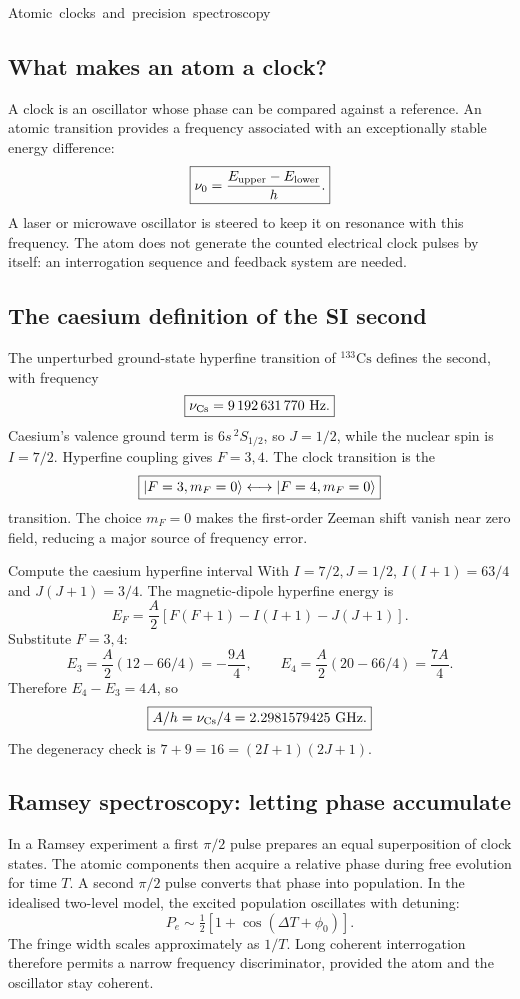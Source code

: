 \unit{Atomic clocks and precision spectroscopy}
\subsection{What makes an atom a clock?}
A clock is an oscillator whose phase
can be compared against a reference.
An atomic transition provides a frequency
associated with an exceptionally stable
energy difference:
\[
\boxed{\nu_0=\frac{E_{\rm upper}-E_{\rm lower}}{h}.}
\]
A laser or microwave oscillator is steered
to keep it on resonance with this
frequency. The atom does not generate
the counted electrical clock pulses
by itself: an interrogation sequence
and feedback system are needed.

\subsection{The caesium definition of the SI second}
The unperturbed ground-state hyperfine
transition of \(^{133}\mathrm{Cs}\) defines
the second, with frequency
\[
\boxed{\nu_{\rm Cs}=9\,192\,631\,770\ \mathrm{Hz}.}
\]
Caesium's valence ground term is
\(6s\,{}^2S_{1/2}\), so \(J=1/2\),
while the nuclear spin is \(I=7/2\).
Hyperfine coupling gives \(F=3,4\).
The clock transition is the
\[
\boxed{\left\lvert F=3,m_F=0\right\rangle
\longleftrightarrow\left\lvert F=4,m_F=0\right\rangle}
\]
transition. The choice \(m_F=0\) makes
the first-order Zeeman shift vanish
near zero field, reducing a major
source of frequency error.

\begin{worked}{Compute the caesium hyperfine interval}
With \(I=7/2,J=1/2\),
\(I(I+1)=63/4\) and \(J(J+1)=3/4\).
The magnetic-dipole hyperfine energy is
\[
E_F=\frac A2
[F(F+1)-I(I+1)-J(J+1)].
\]
Substitute \(F=3,4\):
\[
E_3=\frac A2(12-66/4)
=-\frac{9A}{4},\qquad
E_4=\frac A2(20-66/4)
=\frac{7A}{4}.
\]
Therefore \(E_4-E_3=4A\), so
\[
\boxed{A/h=\nu_{\rm Cs}/4
=2.2981579425\ \mathrm{GHz}.}
\]
The degeneracy check is
\(7+9=16=(2I+1)(2J+1)\).
\end{worked}

\subsection{Ramsey spectroscopy: letting phase accumulate}
In a Ramsey experiment a first
\(\pi/2\) pulse prepares an equal
superposition of clock states.
The atomic components then acquire
a relative phase during free evolution
for time \(T\). A second \(\pi/2\)
pulse converts that phase into
population. In the idealised
two-level model, the excited
population oscillates with detuning:
\[
P_e\sim\tfrac12[1+\cos(\Delta T+\phi_0)].
\]
The fringe width scales approximately
as \(1/T\). Long coherent interrogation
therefore permits a narrow frequency
discriminator, provided the atom
and the oscillator stay coherent.

